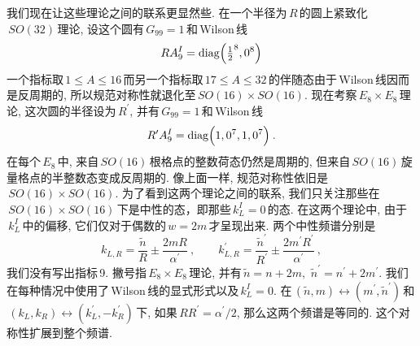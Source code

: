 我们现在让这些理论之间的联系更显然些. 在一个半径为$\,R\,$的圆上紧致化$\,SO(32)\,$理论, 设这个圆有$\,G_{99}=1\,$和\,Wilson\,线
\begin{equation}
    RA_{9}^{I}=\operatorname{diag}\Bigl(\tfrac{1}{2}^{8},0^{8}\Bigr)
    \label{11.6.18}
\end{equation}
一个指标取$\,1\leq A\leq 16\,$而另一个指标取$\,17\leq A\leq 32\,$的伴随态由于\,Wilson\,线因而是反周期的, 所以规范对称性就退化至$\,SO(16)\times SO(16)$. 现在考察$\,E_{8}\times E_{8}\,$理论, 这次圆的半径设为$\,R^{\prime}$, 并有$\,G_{99}=1\,$和\,Wilson\,线
\begin{equation}
    R^{\prime}A_{9}^{I}=\operatorname{diag}\Bigl(1,0^{7},1,0^{7}\Bigr) \:.
    \label{11.6.18}
\end{equation}
在每个$\,E_{8}\,$中, 来自$\,SO(16)\,$根格点的整数荷态仍然是周期的, 但来自$\,SO(16)\,$旋量格点的半整数态变成反周期的. 像上面一样, 规范对称性依旧是$\,SO(16)\times SO(16)$. 为了看到这两个理论之间的联系, 我们只关注那些在$\,SO(16)\times SO(16)\,$下是中性的态，即那些$\,k_{L}^{I}=0\,$的态. 在这两个理论中, 由于$\,k_{L}^{I}\,$中的偏移, 它们仅对于偶数的$\,w=2m\,$才呈现出来. 两个中性频谱分别是
\begin{equation}
    k_{L,R}=\frac{\tilde{n}}{R} \pm \frac{2mR}{\alpha^{\prime}}\:,\qquad k_{L,R}^{\prime} =\frac{\tilde{n}^{\prime}}{R^{\prime}} \pm \frac{2m^{\prime}R^{\prime}}{\alpha^{\prime}}\:,
\end{equation}
我们没有写出指标\,9. 撇号指$\,E_{8}\times E_{8}\,$理论, 并有$\,\tilde{n}=n+2m,$ $\tilde{n}^{\prime}=n^{\prime}+2m^{\prime}$. 我们在每种情况中使用了\,Wilson\,线的显式形式以及$\,k_{L}^{I}=0$. 在$\,(\tilde{n},m)\leftrightarrow (m^{\prime},\tilde{n}^{\prime})\,$和$\,(k_{L},k_{R})\leftrightarrow (k_{L}^{\prime},-k_{R}^{\prime})\,$下, 如果$\,RR^{\prime}=\alpha^{\prime}/2$, 那么这两个频谱是等同的. 这个对称性扩展到整个频谱.


